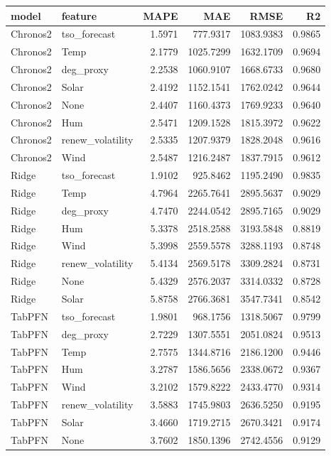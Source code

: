 \begin{tabular}{llrrrr}
\toprule
model & feature & MAPE & MAE & RMSE & R2 \\
\midrule
Chronos2 & tso_forecast & 1.5971 & 777.9317 & 1083.9383 & 0.9865 \\
Chronos2 & Temp & 2.1779 & 1025.7299 & 1632.1709 & 0.9694 \\
Chronos2 & deg_proxy & 2.2538 & 1060.9107 & 1668.6733 & 0.9680 \\
Chronos2 & Solar & 2.4192 & 1152.1541 & 1762.0242 & 0.9644 \\
Chronos2 & None & 2.4407 & 1160.4373 & 1769.9233 & 0.9640 \\
Chronos2 & Hum & 2.5471 & 1209.1528 & 1815.3972 & 0.9622 \\
Chronos2 & renew_volatility & 2.5335 & 1207.9379 & 1828.2048 & 0.9616 \\
Chronos2 & Wind & 2.5487 & 1216.2487 & 1837.7915 & 0.9612 \\
Ridge & tso_forecast & 1.9102 & 925.8462 & 1195.2490 & 0.9835 \\
Ridge & Temp & 4.7964 & 2265.7641 & 2895.5637 & 0.9029 \\
Ridge & deg_proxy & 4.7470 & 2244.0542 & 2895.7165 & 0.9029 \\
Ridge & Hum & 5.3378 & 2518.2588 & 3193.5848 & 0.8819 \\
Ridge & Wind & 5.3998 & 2559.5578 & 3288.1193 & 0.8748 \\
Ridge & renew_volatility & 5.4134 & 2569.5178 & 3309.2824 & 0.8731 \\
Ridge & None & 5.4329 & 2576.2037 & 3314.0332 & 0.8728 \\
Ridge & Solar & 5.8758 & 2766.3681 & 3547.7341 & 0.8542 \\
TabPFN & tso_forecast & 1.9801 & 968.1756 & 1318.5067 & 0.9799 \\
TabPFN & deg_proxy & 2.7229 & 1307.5551 & 2051.0824 & 0.9513 \\
TabPFN & Temp & 2.7575 & 1344.8716 & 2186.1200 & 0.9446 \\
TabPFN & Hum & 3.2787 & 1586.5656 & 2338.0672 & 0.9367 \\
TabPFN & Wind & 3.2102 & 1579.8222 & 2433.4770 & 0.9314 \\
TabPFN & renew_volatility & 3.5883 & 1745.9803 & 2636.5250 & 0.9195 \\
TabPFN & Solar & 3.4660 & 1719.2715 & 2670.3421 & 0.9174 \\
TabPFN & None & 3.7602 & 1850.1396 & 2742.4556 & 0.9129 \\
\bottomrule
\end{tabular}

